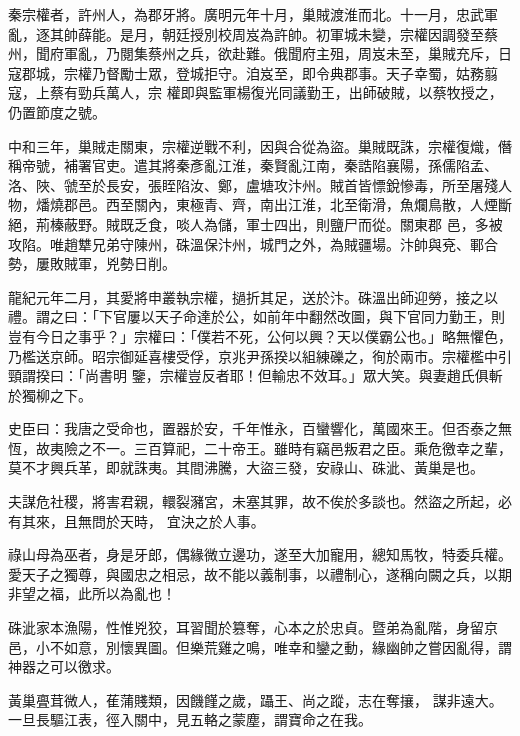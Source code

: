 \begin{pinyinscope}
 秦宗權者，許州人，為郡牙將。廣明元年十月，巢賊渡淮而北。十一月，忠武軍亂，逐其帥薛能。是月，朝廷授別校周岌為許帥。初軍城未變，宗權因調發至蔡州，聞府軍亂，乃閱集蔡州之兵，欲赴難。俄聞府主殂，周岌未至，巢賊充斥，日寇郡城，宗權乃督勵士眾，登城拒守。洎岌至，即令典郡事。天子幸蜀，姑務翦寇，上蔡有勁兵萬人，宗
 權即與監軍楊復光同議勤王，出師破賊，以蔡牧授之，仍置節度之號。



 中和三年，巢賊走關東，宗權逆戰不利，因與合從為盜。巢賊既誅，宗權復熾，僭稱帝號，補署官吏。遣其將秦彥亂江淮，秦賢亂江南，秦誥陷襄陽，孫儒陷孟、洛、陜、虢至於長安，張眰陷汝、鄭，盧塘攻汴州。賊首皆慓銳慘毒，所至屠殘人物，燔燒郡邑。西至關內，東極青、齊，南出江淮，北至衛滑，魚爛鳥散，人煙斷絕，荊榛蔽野。賊既乏食，啖人為儲，軍士四出，則鹽尸而從。關東郡
 邑，多被攻陷。唯趙犨兄弟守陳州，硃溫保汴州，城門之外，為賊疆場。汴帥與兗、鄆合勢，屢敗賊軍，兇勢日削。



 龍紀元年二月，其愛將申叢執宗權，撾折其足，送於汴。硃溫出師迎勞，接之以禮。謂之曰：「下官屢以天子命達於公，如前年中翻然改圖，與下官同力勤王，則豈有今日之事乎？」宗權曰：「僕若不死，公何以興？天以僕霸公也。」略無懼色，乃檻送京師。昭宗御延喜樓受俘，京兆尹孫揆以組練礫之，徇於兩市。宗權檻中引頸謂揆曰：「尚書明
 鑒，宗權豈反者耶！但輸忠不效耳。」眾大笑。與妻趙氏俱斬於獨柳之下。



 史臣曰：我唐之受命也，置器於安，千年惟永，百蠻響化，萬國來王。但否泰之無恆，故夷險之不一。三百算祀，二十帝王。雖時有竊邑叛君之臣。乘危徼幸之輩，莫不才興兵革，即就誅夷。其間沸騰，大盜三發，安祿山、硃泚、黃巢是也。



 夫謀危社稷，將害君親，轘裂瀦宮，未塞其罪，故不俟於多談也。然盜之所起，必有其來，且無問於天時，
 宜決之於人事。



 祿山母為巫者，身是牙郎，偶緣微立邊功，遂至大加寵用，總知馬牧，特委兵權。愛天子之獨尊，與國忠之相忌，故不能以義制事，以禮制心，遂稱向闕之兵，以期非望之福，此所以為亂也！



 硃泚家本漁陽，性惟兇狡，耳習聞於篡奪，心本之於忠貞。暨弟為亂階，身留京邑，小不如意，別懷異圖。但樂荒雞之鳴，唯幸和鑾之動，緣幽帥之嘗因亂得，謂神器之可以徼求。



 黃巢亹茸微人，萑蒲賤類，因饑饉之歲，躡王、尚之蹤，志在奪攘，
 謀非遠大。一旦長驅江表，徑入關中，見五輅之蒙塵，謂寶命之在我。




\end{pinyinscope}
